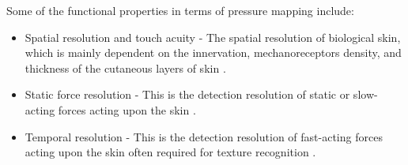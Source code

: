 Some of the functional properties in terms of pressure mapping include:
\begin{itemize}
    \item Spatial resolution and touch acuity - The spatial resolution of biological skin, which is mainly dependent on the innervation, mechanoreceptors density, and thickness of the cutaneous layers of skin \cite{Landry2021,Klein2016,Krotoski1993}.
    \item Static force resolution - This is the detection resolution of static or slow-acting forces acting upon the skin \cite{Krotoski1993}.
    \item Temporal resolution - This is the detection resolution of fast-acting forces acting upon the skin often required for texture recognition \cite{Landry2021,Krotoski1993}.
\end{itemize}

